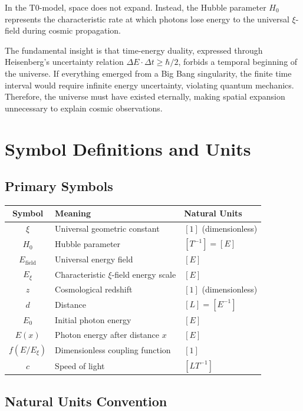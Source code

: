 \documentclass[12pt,a4paper]{report}
\begin{document}
	\begin{revolutionary}
		In the T0-model, space does not expand. Instead, the Hubble parameter $H_0$ represents the characteristic rate at which photons lose energy to the universal $\xi$-field during cosmic propagation.
	\end{revolutionary}
	
	The fundamental insight is that time-energy duality, expressed through Heisenberg's uncertainty relation $\Delta E \cdot \Delta t \geq \hbar/2$, forbids a temporal beginning of the universe. If everything emerged from a Big Bang singularity, the finite time interval would require infinite energy uncertainty, violating quantum mechanics. Therefore, the universe must have existed eternally, making spatial expansion unnecessary to explain cosmic observations.
	
	\section{Symbol Definitions and Units}
	
	\subsection{Primary Symbols}
	
	\begin{longtable}{|c|l|l|}
		\hline
		\textbf{Symbol} & \textbf{Meaning} & \textbf{Natural Units} \\
		\hline
		$\xi$ & Universal geometric constant & $[1]$ (dimensionless) \\
		$H_0$ & Hubble parameter & $[T^{-1}] = [E]$ \\
		$E_{\text{field}}$ & Universal energy field & $[E]$ \\
		$E_\xi$ & Characteristic $\xi$-field energy scale & $[E]$ \\
		$z$ & Cosmological redshift & $[1]$ (dimensionless) \\
		$d$ & Distance & $[L] = [E^{-1}]$ \\
		$E_0$ & Initial photon energy & $[E]$ \\
		$E(x)$ & Photon energy after distance $x$ & $[E]$ \\
		$f(E/E_\xi)$ & Dimensionless coupling function & $[1]$ \\
		$c$ & Speed of light & $[LT^{-1}]$ \\
		\hline
	\end{longtable}
\normalsize
	
	\subsection{Natural Units Convention}
	
\end{document}
